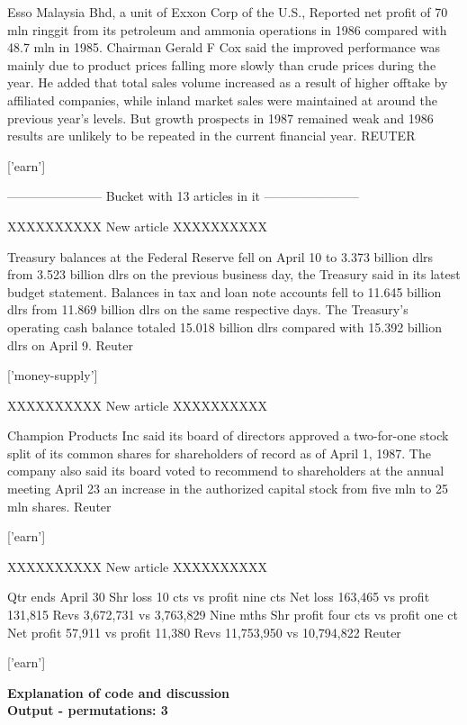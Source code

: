 \documentclass{article}
\begin{document}
\begin{pythonOutput}
Esso Malaysia Bhd, a unit of Exxon
Corp of the U.S., Reported net profit of 70 mln ringgit from
its petroleum and ammonia operations in 1986 compared with 48.7
mln in 1985. Chairman Gerald F Cox said the improved
performance was mainly due to product prices falling more
slowly than crude prices during the year.
    He added that total sales volume increased as a result of
higher offtake by affiliated companies, while inland market
sales were maintained at around the previous year's levels.
    But growth prospects in 1987 remained weak and 1986 results
are unlikely to be repeated in the current financial year.
 REUTER

['earn']

-----------------------
Bucket with 13 articles in it
-----------------------


XXXXXXXXXX
New article
XXXXXXXXXX

Treasury balances at the Federal
Reserve fell on April 10 to 3.373 billion dlrs from 3.523
billion dlrs on the previous business day, the Treasury said in
its latest budget statement.
    Balances in tax and loan note accounts fell to 11.645
billion dlrs from 11.869 billion dlrs on the same respective
days.
    The Treasury's operating cash balance totaled 15.018
billion dlrs compared with 15.392 billion dlrs on April 9.
 Reuter

['money-supply']

XXXXXXXXXX
New article
XXXXXXXXXX

Champion Products Inc said its
board of directors approved a two-for-one stock split of its
common shares for shareholders of record as of April 1, 1987.
    The company also said its board voted to recommend to
shareholders at the annual meeting April 23 an increase in the
authorized capital stock from five mln to 25 mln shares.
 Reuter

['earn']

XXXXXXXXXX
New article
XXXXXXXXXX

Qtr ends April 30
    Shr loss 10 cts vs profit nine cts
    Net loss 163,465 vs profit 131,815
    Revs 3,672,731 vs 3,763,829
    Nine mths
    Shr profit four cts vs profit one ct
    Net profit 57,911 vs profit 11,380
    Revs 11,753,950 vs 10,794,822
 Reuter

['earn']

\end{pythonOutput}
\textbf{Explanation of code and discussion}\\
\textbf{Output - permutations: 3}\\
\end{document}
